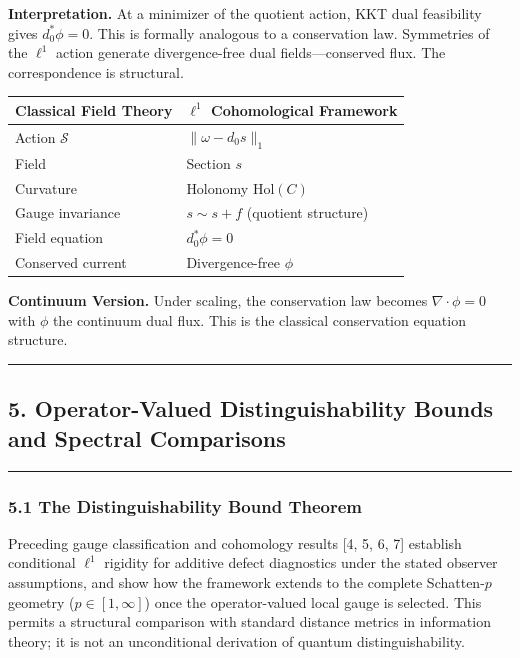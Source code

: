 \documentclass[
]{article}
\begin{document}
\textbf{Interpretation.} At a minimizer of the quotient action, KKT dual feasibility gives
\(d_0^*\phi=0\). This is formally analogous to a conservation law. Symmetries of the \(\ell^1\) action generate divergence-free dual fields---conserved flux. The correspondence is structural.

\begin{longtable}[]{@{}ll@{}}
\toprule\noalign{}
Classical Field Theory & \(\ell^1\) Cohomological Framework \\
\midrule\noalign{}
\endhead
\bottomrule\noalign{}
\endlastfoot
Action \(\mathcal{S}\) & \(\|\omega-d_0 s\|_1\) \\
Field & Section \(s\) \\
Curvature & Holonomy \(\mathrm{Hol}(C)\) \\
Gauge invariance & \(s \sim s + f\) (quotient structure) \\
Field equation & \(d_0^* \phi = 0\) \\
Conserved current & Divergence-free \(\phi\) \\
\end{longtable}

\textbf{Continuum Version.} Under scaling, the conservation law becomes \(\nabla \cdot \phi = 0\) with \(\phi\) the continuum dual flux. This is the classical conservation equation structure.

\begin{center}\rule{0.5\linewidth}{0.5pt}\end{center}

\subsection{5. Operator-Valued Distinguishability Bounds and Spectral Comparisons}\label{operator-valued-distinguishability-bounds-and-spectral-comparisons}

\begin{center}\rule{0.5\linewidth}{0.5pt}\end{center}

\subsubsection{5.1 The Distinguishability Bound Theorem}\label{the-distinguishability-bound-theorem}

Preceding gauge classification and cohomology results {[}4, 5, 6, 7{]} establish conditional \(\ell^1\) rigidity for additive defect diagnostics under the stated observer assumptions, and show how the framework extends to the complete Schatten-\(p\) geometry (\(p \in [1, \infty]\)) once the operator-valued local gauge is selected. This permits a structural comparison with standard distance metrics in information theory; it is not an unconditional derivation of quantum distinguishability.
\end{document}
